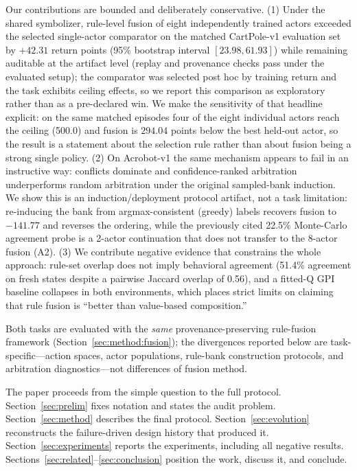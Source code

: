 \documentclass[11pt]{article}
\begin{document}
Our contributions are bounded and deliberately conservative. (1) Under the shared symbolizer,
rule-level fusion of eight independently trained actors exceeded the selected single-actor comparator
on the matched CartPole-v1 evaluation set by $+42.31$ return points (95\% bootstrap interval
$[23.98,61.93]$) while remaining auditable at the artifact level (replay and provenance checks pass
under the evaluated setup); the comparator was selected post hoc by training return and the task
exhibits ceiling effects, so we report this comparison as exploratory rather than as a
pre-declared win. We make the sensitivity of that headline explicit: on the same matched episodes four
of the eight individual actors reach the ceiling (500.0) and fusion is $294.04$ points below the best
held-out actor, so the result is a statement about the selection rule rather than about fusion being a
strong single policy. (2) On Acrobot-v1 the same mechanism appears to fail in an instructive way: conflicts dominate and
confidence-ranked arbitration underperforms random arbitration under the original sampled-bank
induction. We show this is an induction/deployment protocol artifact, not a task limitation: re-inducing
the bank from argmax-consistent (greedy) labels recovers fusion to $-141.77$ and reverses the ordering,
while the previously cited 22.5\% Monte-Carlo agreement probe is a 2-actor continuation that does not
transfer to the 8-actor fusion (A2).
(3) We contribute negative evidence that constrains the whole approach: rule-set overlap does not
imply behavioral agreement (51.4\% agreement on fresh states despite a pairwise Jaccard overlap of
0.56), and a fitted-Q GPI baseline collapses in both environments, which places strict limits on
claiming that rule fusion is ``better than value-based composition.''

Both tasks are evaluated with the \emph{same} provenance-preserving rule-fusion framework
(Section~\ref{sec:method:fusion}); the divergences reported below are task-specific---action
spaces, actor populations, rule-bank construction protocols, and arbitration diagnostics---not
differences of fusion method.

The paper proceeds from the simple question to the full protocol. Section~\ref{sec:prelim} fixes
notation and states the audit problem. Section~\ref{sec:method} describes the final protocol.
Section~\ref{sec:evolution} reconstructs the failure-driven design history that produced it.
Section~\ref{sec:experiments} reports the experiments, including all negative results.
Sections~\ref{sec:related}--\ref{sec:conclusion} position the work, discuss it, and conclude.
\end{document}
